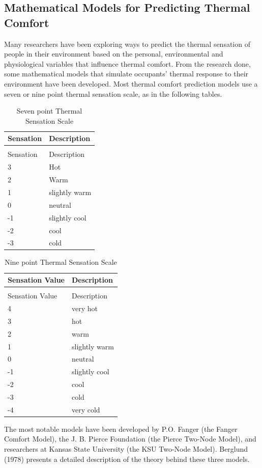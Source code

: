 \subsection{Mathematical Models for Predicting Thermal Comfort}\label{mathematical-models-for-predicting-thermal-comfort}

Many researchers have been exploring ways to predict the thermal sensation of people in their environment based on the personal, environmental and physiological variables that influence thermal comfort. From the research done, some mathematical models that simulate occupants' thermal response to their environment have been developed. Most thermal comfort prediction models use a seven or nine point thermal sensation scale, as in the following tables.

\begin{longtable}[c]{@{}ll@{}}
\caption{Seven point Thermal Sensation Scale \label{table:seven-point-thermal-sensation-scale}} \tabularnewline
\toprule 
Sensation & Description \tabularnewline
\midrule
\endfirsthead

\caption[]{Seven point Thermal Sensation Scale} \tabularnewline
\toprule 
Sensation & Description \tabularnewline
\midrule
\endhead

3 & Hot \tabularnewline
2 & Warm \tabularnewline
1 & slightly warm \tabularnewline
0 & neutral \tabularnewline
-1 & slightly cool \tabularnewline
-2 & cool \tabularnewline
-3 & cold \tabularnewline
\bottomrule
\end{longtable}

\begin{longtable}[c]{@{}ll@{}}
\caption{Nine point Thermal Sensation Scale \label{table:nine-point-thermal-sensation-scale}} \tabularnewline
\toprule 
Sensation Value & Description \tabularnewline
\midrule
\endfirsthead

\caption[]{Nine point Thermal Sensation Scale} \tabularnewline
\toprule 
Sensation Value & Description \tabularnewline
\midrule
\endhead

4 & very hot \tabularnewline
3 & hot \tabularnewline
2 & warm \tabularnewline
1 & slightly warm \tabularnewline
0 & neutral \tabularnewline
-1 & slightly cool \tabularnewline
-2 & cool \tabularnewline
-3 & cold \tabularnewline
-4 & very cold \tabularnewline
\bottomrule
\end{longtable}

The most notable models have been developed by P.O. Fanger (the Fanger Comfort Model), the J. B. Pierce Foundation (the Pierce Two-Node Model), and researchers at Kansas State University (the KSU Two-Node Model). Berglund (1978) presents a detailed description of the theory behind these three models.

